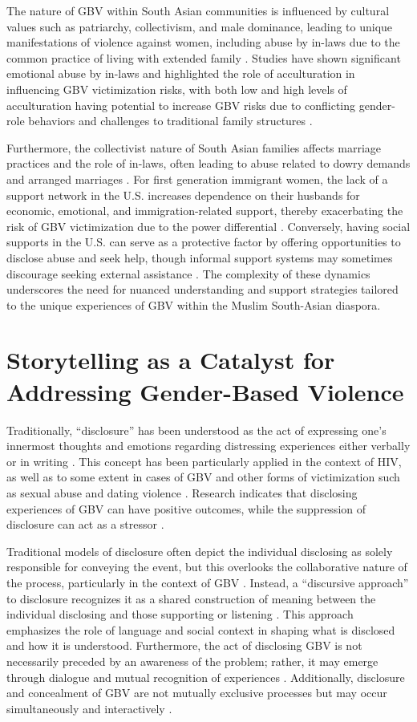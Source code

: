 \documentclass[manuscript,screen]{acmart}
\begin{document}
The nature of GBV within South Asian communities is influenced by cultural values such as patriarchy, collectivism, and male dominance, leading to unique manifestations of violence against women, including abuse by in-laws due to the common practice of living with extended family \cite{25}. Studies have shown significant emotional abuse by in-laws and highlighted the role of acculturation in influencing GBV victimization risks, with both low and high levels of acculturation having potential to increase GBV risks due to conflicting gender-role behaviors and challenges to traditional family structures \cite{25}.

Furthermore, the collectivist nature of South Asian families affects marriage practices and the role of in-laws, often leading to abuse related to dowry demands and arranged marriages \cite{24,26}. For first generation immigrant women, the lack of a support network in the U.S. increases dependence on their husbands for economic, emotional, and immigration-related support, thereby exacerbating the risk of GBV victimization due to the power differential \cite{27}. Conversely, having social supports in the U.S. can serve as a protective factor by offering opportunities to disclose abuse and seek help, though informal support systems may sometimes discourage seeking external assistance \cite{28}. The complexity of these dynamics underscores the need for nuanced understanding and support strategies tailored to the unique experiences of GBV within the Muslim South-Asian diaspora.

\section{Storytelling as a Catalyst for Addressing Gender-Based Violence}
Traditionally, “disclosure” has been understood as the act of expressing one's innermost thoughts and emotions regarding distressing experiences either verbally or in writing \cite{31}. This concept has been particularly applied in the context of HIV, as well as to some extent in cases of GBV and other forms of victimization such as sexual abuse and dating violence \cite{32,33}. Research indicates that disclosing experiences of GBV can have positive outcomes, while the suppression of disclosure can act as a stressor \cite{33,34,35,36,37,38}.

Traditional models of disclosure often depict the individual disclosing as solely responsible for conveying the event, but this overlooks the collaborative nature of the process, particularly in the context of GBV \cite{39}. Instead, a “discursive approach” to disclosure recognizes it as a shared construction of meaning between the individual disclosing and those supporting or listening \cite{39}. This approach emphasizes the role of language and social context in shaping what is disclosed and how it is understood. Furthermore, the act of disclosing GBV is not necessarily preceded by an awareness of the problem; rather, it may emerge through dialogue and mutual recognition of experiences \cite{42}. Additionally, disclosure and concealment of GBV are not mutually exclusive processes but may occur simultaneously and interactively \cite{40,41}.
\end{document}
